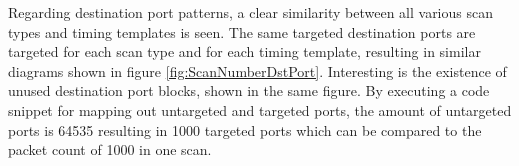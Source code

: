 Regarding destination port patterns, a clear similarity between all various scan types and timing templates is seen.
The same targeted destination ports are targeted for each scan type and for each timing template, resulting in similar diagrams shown in figure \ref{fig:ScanNumberDstPort}.
Interesting is the existence of unused destination port blocks, shown in the same figure.
By executing a code snippet for mapping out untargeted and targeted ports, the amount of untargeted ports is 64535 resulting in 1000 targeted ports which can be compared to the packet count of 1000 in one scan.


